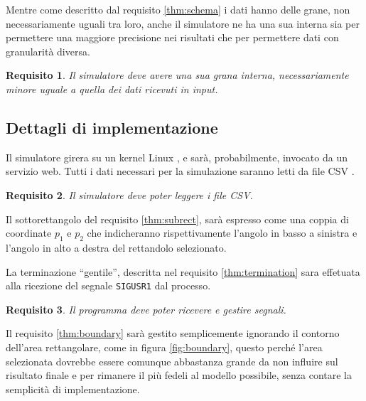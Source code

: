 \documentclass[draft]{article}
\newcommand{\eng}[1]{\foreignlanguage{english}{#1}} %
\newtheorem{requirement}{Requisito}
\begin{document}
Mentre come descritto dal requisito \ref{thm:schema} i dati hanno delle grane,
non necessariamente uguali tra loro, anche il simulatore ne ha una sua interna
sia per permettere una maggiore precisione nei risultati che per permettere dati
con granularità diversa.

\begin{requirement}\label{thm:grain}
Il simulatore deve avere una sua grana interna, necessariamente minore uguale a
quella dei dati ricevuti in \eng{input}.
\end{requirement}

\subsection{Dettagli di implementazione}\label{sec:implementation}

Il simulatore girera su un \eng{kernel} Linux \cite{kern}, e sarà,
probabilmente, invocato da un servizio \eng{web}. Tutti i dati necessari per la
simulazione saranno letti da \eng{file} CSV \cite{csv}.

\begin{requirement}\label{thm:csv}
Il simulatore deve poter leggere i \eng{file} CSV.
\end{requirement}

Il sottorettangolo del requisito \ref{thm:subrect}, sarà espresso come una
coppia di coordinate $p_1$ e $p_2$ che indicheranno rispettivamente l'angolo in
basso a sinistra e l'angolo in alto a destra del rettandolo selezionato.

La terminazione ``gentile'', descritta nel requisito \ref{thm:termination} sara
effetuata alla ricezione del segnale \texttt{SIGUSR1} dal processo.

\begin{requirement}
Il programma deve poter ricevere e gestire segnali.
\end{requirement}

Il requisito \ref{thm:boundary} sarà gestito semplicemente ignorando il contorno
dell'area rettangolare, come in figura \ref{fig:boundary}, questo perché l'area
selezionata dovrebbe essere comunque abbastanza grande da non influire sul
risultato finale e per rimanere il più fedeli al modello possibile, senza
contare la semplicità di implementazione.
\end{document}
